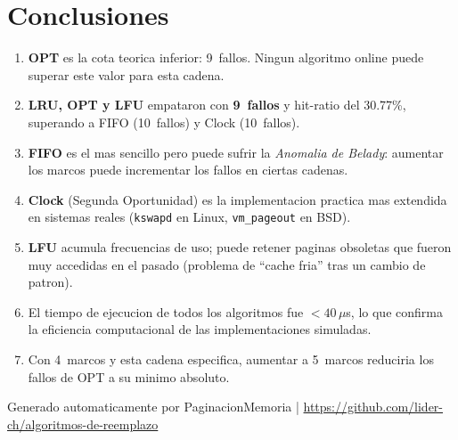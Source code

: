 \documentclass[12pt,a4paper]{article}
\begin{document}
\newpage
\section{Conclusiones}

\begin{enumerate}
  \item \textbf{OPT} es la cota teorica inferior: 9~fallos.
        Ningun algoritmo online puede superar este valor para esta cadena.

  \item \textbf{LRU, OPT y LFU} empataron con
        \textcolor{hitcol}{\textbf{9~fallos}} y
        hit-ratio del 30.77\%,
        superando a FIFO (10~fallos)
        y Clock (10~fallos).

  \item \textbf{FIFO} es el mas sencillo pero puede sufrir la
        \textit{Anomalia de Belady}: aumentar los marcos puede
        incrementar los fallos en ciertas cadenas.

  \item \textbf{Clock} (Segunda Oportunidad) es la implementacion
        practica mas extendida en sistemas reales
        (\texttt{kswapd} en Linux, \texttt{vm\_pageout} en BSD).

  \item \textbf{LFU} acumula frecuencias de uso; puede retener paginas
        obsoletas que fueron muy accedidas en el pasado
        (problema de ``cache fria'' tras un cambio de patron).

  \item El tiempo de ejecucion de todos los algoritmos fue
        $< 40\,\mu$s, lo que confirma la eficiencia computacional
        de las implementaciones simuladas.

  \item Con 4~marcos y esta cadena especifica, aumentar a 5~marcos
        reduciria los fallos de OPT a su minimo absoluto.
\end{enumerate}

\bigskip
\begin{center}
\small\color{gray}
Generado automaticamente por PaginacionMemoria \quad|\quad
\url{https://github.com/lider-ch/algoritmos-de-reemplazo}
\end{center}
\end{document}
